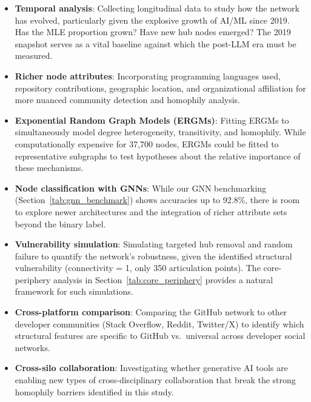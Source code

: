 \documentclass[letterpaper]{article}
\begin{document}
\begin{itemize}
  \item \textbf{Temporal analysis}: Collecting longitudinal data to study how the network has evolved, particularly given the explosive growth of AI/ML since 2019. Has the MLE proportion grown? Have new hub nodes emerged? The 2019 snapshot serves as a vital baseline against which the post-LLM era must be measured.

  \item \textbf{Richer node attributes}: Incorporating programming languages used, repository contributions, geographic location, and organizational affiliation for more nuanced community detection and homophily analysis.

  \item \textbf{Exponential Random Graph Models (ERGMs)}: Fitting ERGMs to simultaneously model degree heterogeneity, transitivity, and homophily. While computationally expensive for 37,700 nodes, ERGMs could be fitted to representative subgraphs to test hypotheses about the relative importance of these mechanisms.

  \item \textbf{Node classification with GNNs}: While our GNN benchmarking (Section~\ref{tab:gnn_benchmark}) shows accuracies up to 92.8\%, there is room to explore newer architectures and the integration of richer attribute sets beyond the binary label.

  \item \textbf{Vulnerability simulation}: Simulating targeted hub removal and random failure to quantify the network's robustness, given the identified structural vulnerability (connectivity = 1, only 350 articulation points). The core-periphery analysis in Section~\ref{tab:core_periphery} provides a natural framework for such simulations.

  \item \textbf{Cross-platform comparison}: Comparing the GitHub network to other developer communities (Stack Overflow, Reddit, Twitter/X) to identify which structural features are specific to GitHub vs.\ universal across developer social networks.

  \item \textbf{Cross-silo collaboration}: Investigating whether generative AI tools are enabling new types of cross-disciplinary collaboration that break the strong homophily barriers identified in this study.
\end{itemize}

\nocite{*}


\end{document}
